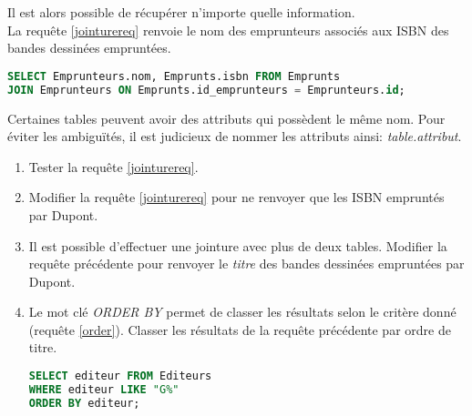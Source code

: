 \documentclass[a4paper,11pt]{article}
\begin{document}
\begin{Form}
\begin{center}
\begin{tikzpicture}[scale=0.8]
\end{tikzpicture}
\label{virtuelle}
\end{center}
Il est alors possible de récupérer n'importe quelle information.\\
La requête \ref{jointurereq} renvoie le nom des emprunteurs associés aux ISBN des bandes dessinées empruntées.
\begin{center}
\begin{lstlisting}[language=SQL]
SELECT Emprunteurs.nom, Emprunts.isbn FROM Emprunts 
JOIN Emprunteurs ON Emprunts.id_emprunteurs = Emprunteurs.id;
\end{lstlisting}
\label{jointurereq}
\end{center}
\begin{aretenir}[Remarque]
Certaines tables peuvent avoir des attributs qui possèdent le même nom. Pour éviter les ambiguïtés, il est judicieux de nommer les attributs ainsi: \emph{table.attribut}.
\end{aretenir}
\begin{activite}
\begin{enumerate}
\item Tester la requête \ref{jointurereq}.
\item Modifier la requête \ref{jointurereq} pour ne renvoyer que les ISBN empruntés par Dupont.
\item Il est possible d'effectuer une jointure avec plus de deux tables. Modifier la requête précédente pour renvoyer le \emph{titre} des bandes dessinées empruntées par Dupont.
\item Le mot clé \emph{ORDER BY} permet de classer les résultats selon le critère donné (requête \ref{order}). Classer les résultats de la requête précédente par ordre de titre.
\begin{center}
\begin{lstlisting}[language=SQL]
SELECT editeur FROM Editeurs 
WHERE editeur LIKE "G%"
ORDER BY editeur;
\end{lstlisting}
\label{order}
\end{center}
\end{enumerate}
\end{activite}
\end{Form}
\end{document}
